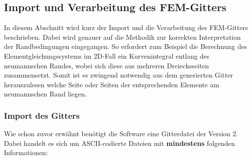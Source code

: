 \subsection{Import und Verarbeitung des FEM-Gitters}
In diesem Abschnitt wird kurz der Import und die Verarbeitung des FEM-Gitters beschrieben. Dabei wird genauer auf die Methodik zur korrekten Interpretation der Randbedingungen eingegangen. So erfordert zum Beispiel die Berechnung des Elementgleichungssystems im 2D-Fall ein Kurvenintegral entlang des neumannschen Randes, wobei sich diese aus mehreren Dreiecksseiten zusammensetzt. Somit ist es zwingend notwendig aus dem generierten Gitter herauszulesen welche Seite oder Seiten der entsprechenden Elemente am neumannschen Rand liegen.

\subsubsection{Import des Gitters}
Wie schon zuvor erwähnt benötigt die Software eine Gitterdatei der Version 2. Dabei handelt es sich um ASCII-codierte Dateien mit \textbf{mindestens} folgenden Informationen:

